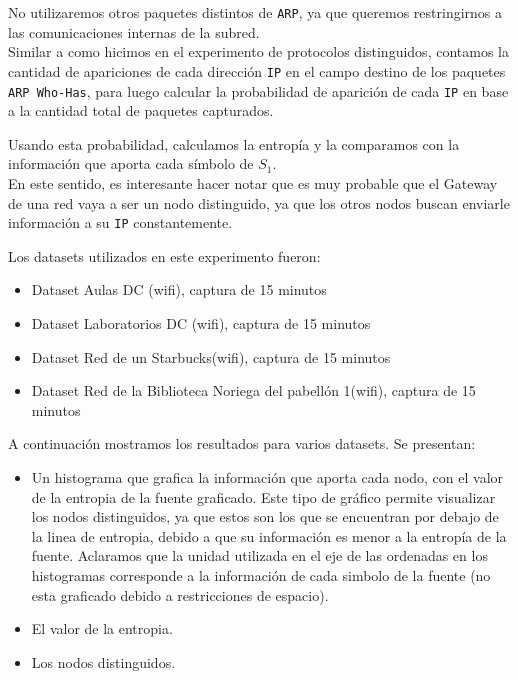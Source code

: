 No utilizaremos otros paquetes distintos de \texttt{ARP}, ya que queremos restringirnos a las comunicaciones internas de la subred. \\

Similar a como hicimos en el experimento de protocolos distinguidos, contamos la cantidad de apariciones de cada dirección \texttt{IP} en el campo destino de los paquetes \texttt{ARP Who-Has}, para luego calcular la probabilidad de aparición de cada \texttt{IP} en base a la cantidad total de paquetes capturados.

Usando esta probabilidad, calculamos la entropía y la comparamos con la información que aporta cada símbolo de $S_1$.\\

En este sentido, es interesante hacer notar que es muy probable que el Gateway de una red vaya a ser un nodo distinguido,
    ya que los otros nodos buscan enviarle información a su  \texttt{IP} constantemente.

\vspace{0.5em}


Los datasets utilizados en este experimento fueron: \\

\begin{itemize}
    \item Dataset Aulas DC (wifi), captura de 15 minutos
    \item Dataset Laboratorios DC (wifi), captura de 15 minutos
    \item Dataset Red de un Starbucks(wifi), captura de 15 minutos
    \item Dataset Red de la Biblioteca Noriega del pabellón 1(wifi), captura de 15 minutos
\end{itemize}

\vspace{0.5em}

A continuación mostramos los resultados para varios datasets. Se presentan:

\begin{itemize}
    \item Un histograma que grafica la información que aporta cada nodo, con el valor de la entropia de la fuente graficado. Este tipo de gráfico permite visualizar los nodos distinguidos, ya que estos son los que se encuentran por debajo de la linea de entropia, debido a que su información es menor a la entropía de la fuente. Aclaramos que la unidad utilizada en el eje de las ordenadas en los histogramas corresponde a la información de cada simbolo de la fuente (no esta graficado debido a restricciones de espacio).
    \item El valor de la entropia.
    \item Los nodos distinguidos.
\end{itemize}

